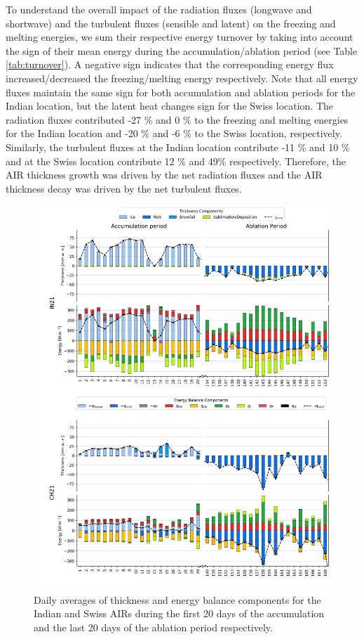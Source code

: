 \documentclass[utf8]{frontiersSCNS}
\begin{document}
To understand the overall impact of the radiation fluxes (longwave and shortwave) and the turbulent fluxes
(sensible and latent) on the freezing and melting energies, we sum their respective energy turnover by taking into
account the sign of their mean energy during the accumulation/ablation period (see Table \ref{tab:turnover}). A
negative sign indicates that the corresponding energy flux increased/decreased the freezing/melting energy
respectively. Note that all energy fluxes maintain the same sign for both accumulation and ablation
periods for the Indian location, but the latent heat changes sign for the Swiss location. The radiation fluxes
contributed -27 \% and 0 \% to the freezing and melting energies for the Indian location and -20 \% and -6 \%
to the Swiss location, respectively.  Similarly, the turbulent fluxes at the Indian location contribute -11 \% and
10 \% and at the Swiss location contribute 12 \% and 49\%  respectively. Therefore, the AIR thickness growth was
driven by the net radiation fluxes and the AIR thickness decay was driven by the net turbulent fluxes.

\begin{figure}
	\begin{center}
		\includegraphics[width=\linewidth]{Figures/Figure_7.jpg} \end{center}
	\caption{Daily averages of thickness and energy balance components for the Indian and Swiss AIRs during the
		first 20 days of the accumulation and the last 20 days of the ablation period respectively.  } \label{fig:MEB}
\end{figure}
\end{document}

